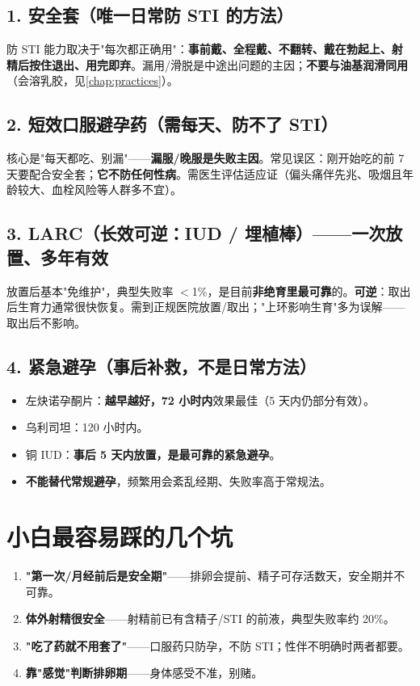 \subsection*{1. 安全套（唯一日常防 STI 的方法）}

防 STI 能力取决于"每次都正确用"：\textbf{事前戴、全程戴、不翻转、戴在勃起上、射精后按住退出、用完即弃}。漏用/滑脱是中途出问题的主因；\textbf{不要与油基润滑同用}（会溶乳胶，见\ref{chap:practices}）。

\subsection*{2. 短效口服避孕药（需每天、防不了 STI）}

核心是"每天都吃、别漏"——\textbf{漏服/晚服是失败主因}。常见误区：刚开始吃的前 7 天要配合安全套；\textbf{它不防任何性病}。需医生评估适应证（偏头痛伴先兆、吸烟且年龄较大、血栓风险等人群多不宜）。

\subsection*{3. LARC（长效可逆：IUD / 埋植棒）——一次放置、多年有效}

放置后基本"免维护"，典型失败率 $<$1\%，是目前\textbf{非绝育里最可靠}的。\textbf{可逆}：取出后生育力通常很快恢复。需到正规医院放置/取出；"上环影响生育"多为误解——取出后不影响。

\subsection*{4. 紧急避孕（事后补救，不是日常方法）}

\begin{itemize}[leftmargin=2em,itemsep=0.3em]
  \item 左炔诺孕酮片：\textbf{越早越好，72 小时内}效果最佳（5 天内仍部分有效）。
  \item 乌利司坦：120 小时内。
  \item 铜 IUD：\textbf{事后 5 天内放置，是最可靠的紧急避孕}。
  \item \textbf{不能替代常规避孕}，频繁用会紊乱经期、失败率高于常规法。
\end{itemize}

\section{小白最容易踩的几个坑}

\begin{enumerate}[leftmargin=2em,itemsep=0.3em]
  \item \textbf{"第一次/月经前后是安全期"}——排卵会提前、精子可存活数天，安全期并不可靠。
  \item \textbf{体外射精很安全}——射精前已有含精子/STI 的前液，典型失败率约 20\%。
  \item \textbf{"吃了药就不用套了"}——口服药只防孕，不防 STI；性伴不明确时两者都要。
  \item \textbf{靠"感觉"判断排卵期}——身体感受不准，别赌。
\end{enumerate}

